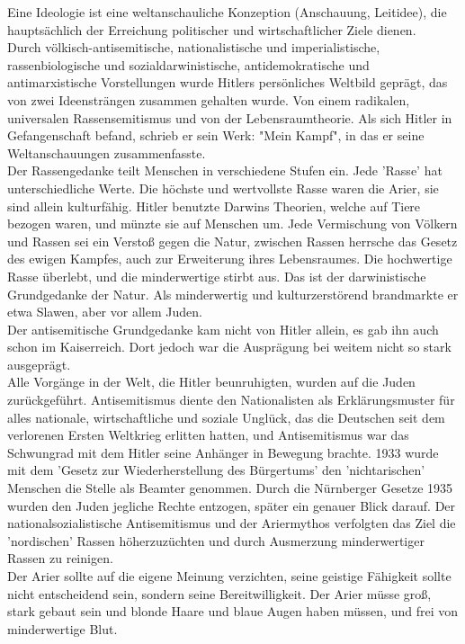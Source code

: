 \documentclass[letterpaper, 12pt]{article}
\begin{document}

Eine Ideologie ist eine weltanschauliche Konzeption (Anschauung, Leitidee), die hauptsächlich der Erreichung politischer und wirtschaftlicher Ziele dienen. \\
Durch völkisch-antisemitische, nationalistische und imperialistische, rassenbiologische und sozialdarwinistische, antidemokratische und antimarxistische Vorstellungen wurde Hitlers persönliches Weltbild geprägt, das von zwei Ideensträngen zusammen gehalten wurde. Von einem radikalen, universalen Rassensemitismus und von der Lebensraumtheorie. Als sich Hitler in Gefangenschaft befand, schrieb er sein Werk: "Mein Kampf", in das er seine Weltanschauungen zusammenfasste. \\
Der Rassengedanke teilt Menschen in verschiedene Stufen ein. Jede 'Rasse' hat unterschiedliche Werte. Die höchste und wertvollste Rasse waren die Arier, sie sind allein kulturfähig. Hitler benutzte Darwins Theorien, welche auf Tiere bezogen waren, und münzte sie auf Menschen um. Jede Vermischung von Völkern und Rassen sei ein Verstoß gegen die Natur, zwischen Rassen herrsche das Gesetz des ewigen Kampfes, auch zur Erweiterung ihres Lebensraumes. Die hochwertige Rasse überlebt, und die minderwertige stirbt aus. Das ist der darwinistische Grundgedanke der Natur. Als minderwertig und kulturzerstörend brandmarkte er etwa Slawen, aber vor allem Juden. \\
Der antisemitische Grundgedanke kam nicht von Hitler allein, es gab ihn auch schon im Kaiserreich. Dort jedoch war die Ausprägung bei weitem nicht so stark ausgeprägt. \\
Alle Vorgänge in der Welt, die Hitler beunruhigten, wurden auf die Juden zurückgeführt. Antisemitismus diente den Nationalisten als Erklärungsmuster für alles nationale, wirtschaftliche und soziale Unglück, das die Deutschen seit dem verlorenen Ersten Weltkrieg erlitten hatten, und Antisemitismus war das Schwungrad mit dem Hitler seine Anhänger in Bewegung brachte. 1933 wurde mit dem 'Gesetz zur Wiederherstellung des Bürgertums' den 'nichtarischen' Menschen die Stelle als Beamter genommen. Durch die Nürnberger Gesetze 1935 wurden den Juden jegliche Rechte entzogen, später ein genauer Blick darauf. Der nationalsozialistische Antisemitismus und der Ariermythos verfolgten das Ziel die 'nordischen' Rassen höherzuzüchten und durch Ausmerzung minderwertiger Rassen zu reinigen. \\
Der Arier sollte auf die eigene Meinung verzichten, seine geistige Fähigkeit sollte nicht entscheidend sein, sondern seine Bereitwilligkeit. Der Arier müsse groß, stark gebaut sein und blonde Haare und blaue Augen haben müssen, und frei von minderwertige Blut. \\
\end{document}
